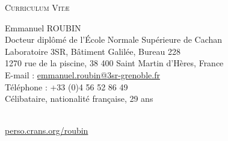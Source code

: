 \documentclass[a4paper,11pt]{article}
\begin{document}
\begin{center} \par\textsc{\huge Curriculum Vit\ae} \end{center}
\begin{minipage}{0.7\linewidth}
  \begin{flushleft}
    \LARGE Emmanuel ROUBIN \normalsize  \vspace{0.1cm} \\
    \large Docteur diplômé de l'École Normale Supérieure de Cachan \normalsize\\\vspace{0.2cm}
    Laboratoire 3SR, Bâtiment Galilée, Bureau 228\\
    1270 rue de la piscine, 38 400 Saint Martin d'Hères, France\\\vspace{0.2cm}
    E-mail : \href{mailto:emmanuel.roubin@3sr-grenoble.fr}{emmanuel.roubin@3sr-grenoble.fr}\\
    Téléphone : +33 (0)4 56 52 86 49\\\vspace{0.2cm}
    Célibataire, nationalité fran\c caise, 29 ans\\
  \end{flushleft}
\end{minipage}
\hfill
\begin{minipage}{4cm}
  \centering
   \\ \vspace{0.1cm}
  \footnotesize\href{http://perso.crans.org/roubin}{perso.crans.org/roubin}
\end{minipage}
\vspace{0.5cm}
\end{document}
